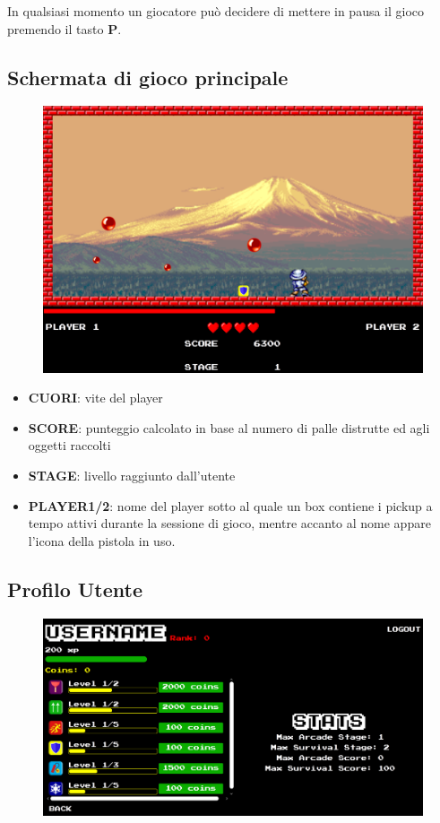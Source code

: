 \documentclass[a4paper,12pt]{report}
\begin{document}
In qualsiasi momento un giocatore può decidere di mettere in pausa il gioco premendo il tasto \textbf{P}.


\subsection*{Schermata di gioco principale}
\begin{figure}[H]
\includegraphics[width=\linewidth]{img/7}
\label{img:decorator}
\end{figure}

\begin{itemize}
\item \textbf{CUORI}:     vite del player
\item \textbf{SCORE}:     punteggio calcolato in base al numero di palle distrutte ed agli
             oggetti raccolti
\item \textbf{STAGE}:     livello raggiunto dall'utente
\item \textbf{PLAYER1/2}: nome del player sotto al quale un box contiene i pickup a tempo attivi durante la   
             sessione di gioco, mentre accanto al nome appare l'icona della pistola in uso.
\end{itemize}

\subsection*{Profilo Utente}
\begin{figure}[H]
\includegraphics[width=\linewidth]{img/8}
\label{img:decorator}
\end{figure}
\end{document}
